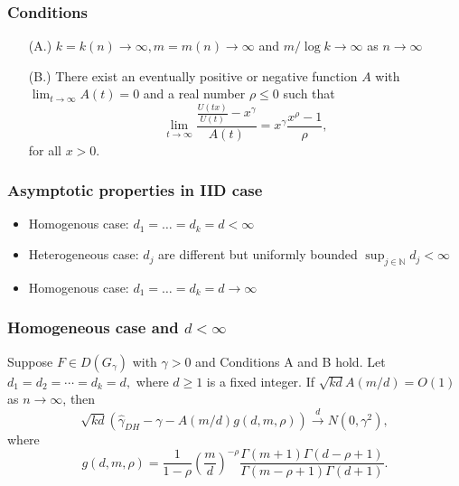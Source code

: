 \documentclass{beamer}
\newcommand{\suit}[1]{\left(#1\right)}
\begin{document}
\begin{frame}
    \frametitle{Conditions}
    \begin{itemize}
        \item[(A.)] $k=k(n)\to \infty, m=m(n)\to \infty $ and $m/\log k \to \infty$ as $n \to \infty$
        \bigskip
        \item[(B.)] There exist an eventually positive or negative function $A$ with $\lim_{t\to \infty} A(t)=0$ and a real number $\rho\le 0$ such that 
        $$
            \lim_{t\to\infty}\frac{\frac{U(tx)}{U(t)}-x^{\gamma}}{A(t)}=x^{\gamma}\frac{x^{\rho}-1}{\rho},
        $$
        for all $x>0$.
    \end{itemize}
\end{frame}

\begin{frame}
    \frametitle{Asymptotic properties in IID case}

    \begin{itemize}
        \item Homogenous case: $d_1 = \dots = d_k =d <\infty$ 
        \bigskip
        \item Heterogeneous case: $d_j$ are different but uniformly bounded $\sup_{j\in \mathbb{N}} d_j<\infty$
        \bigskip
        \item Homogenous case: $d_1 = \dots = d_k =d \to \infty$ 
    \end{itemize}
\end{frame}



\begin{frame}
    \frametitle{Homogeneous case and  $d<\infty$ }
\begin{theorem}
    Suppose $F\in D(G_{\gamma})$
  with $\gamma>0$ and  Conditions A and  B hold.  Let $d_1=d_2=\cdots=d_k=d,$ where $d\ge 1$ is a fixed integer. If $\sqrt{kd}A(m/d)=O(1)$ as $n \to \infty$, then
  $$
    \sqrt{kd}\suit{ \hat{\gamma}_{DH}-\gamma-A(m/d)g(d,m,\rho)} \stackrel{d}{\to} N(0,\gamma^2),
  $$
  where
$$
g(d,m,\rho)=
\dfrac{1}{1-\rho}\left(\dfrac{m}{d}\right)^{-\rho} \dfrac{\Gamma(m+1)\Gamma(d-\rho+1)}{\Gamma(m-\rho+1) \Gamma(d+1)}.
$$
\end{theorem}
\end{frame}
\end{document}
